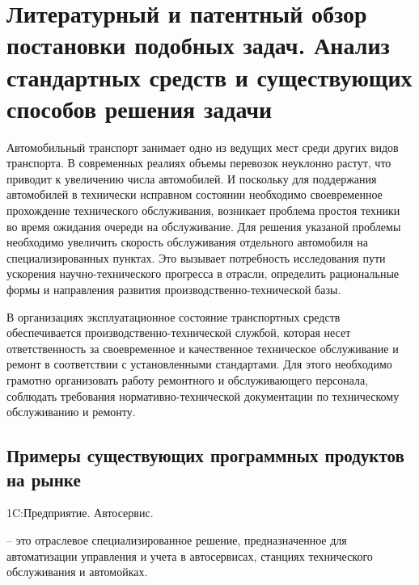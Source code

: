 \section{Литературный и патентный обзор постановки подобных задач.
Анализ стандартных средств и существующих способов решения задачи}

Автомобильный транспорт занимает одно из ведущих мест среди других видов
транспорта. В современных реалиях объемы перевозок неуклонно растут, что
приводит к увеличению числа автомобилей. И поскольку для поддержания
автомобилей в технически исправном состоянии необходимо своевременное
прохождение технического обслуживания, возникает проблема простоя техники во
время ожидания очереди на обслуживание. Для решения указаной проблемы
необходимо увеличить скорость обслуживания отдельного автомобиля на
специализированных пунктах. Это вызывает потребность исследования пути
ускорения научно-технического прогресса в отрасли, определить рациональные
формы и направления развития производственно-технической базы.

В организациях эксплуатационное состояние транспортных средств обеспечивается
производственно-технической службой, которая несет ответственность за
своевременное и качественное техническое обслуживание и ремонт в соответствии с
установленными стандартами. Для этого необходимо грамотно организовать работу
ремонтного и обслуживающего персонала, соблюдать требования
нормативно-технической документации по техническому обслуживанию и ремонту.

\subsection{Примеры существующих программных продуктов на рынке}
1C:Предприятие. Автосервис.

 – это отраслевое специализированное решение, предназначенное
для автоматизации управления и учета в автосервисах, станциях технического
обслуживания и автомойках.

